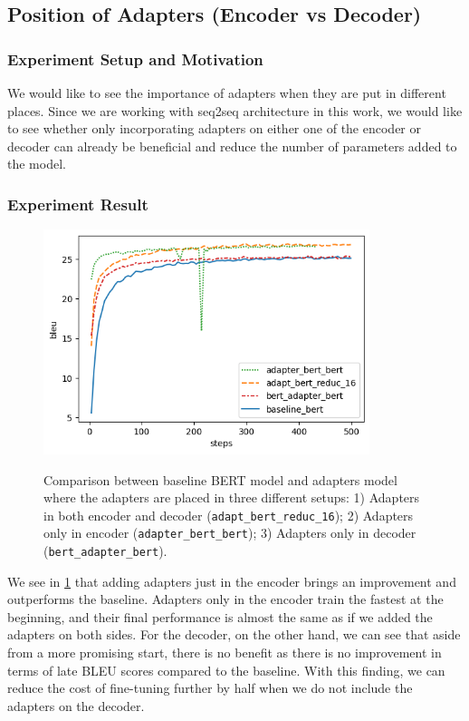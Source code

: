 \subsection{Position of Adapters (Encoder vs Decoder)}
\label{sec:posada}
\subsubsection{Experiment Setup and Motivation}
We would like to see the importance of adapters when they are put in different places. Since we are working with seq2seq architecture in this work, we would like to see whether only incorporating adapters on either one of the encoder or decoder can already be beneficial and reduce the number of parameters added to the model.

\subsubsection{Experiment Result}
\begin{figure}[]
    {\includegraphics[width=0.85\textwidth]{img/bert_pos.png}}
    \centering
    \caption[Results of ablation study for adapters in the encoder or the decoder.]{Comparison between baseline BERT model and adapters model where the adapters are placed in three different setups: 1) Adapters in both encoder and decoder (\texttt{adapt\_bert\_reduc\_16}); 2) Adapters only in encoder (\texttt{adapter\_bert\_bert}); 3) Adapters only in decoder (\texttt{bert\_adapter\_bert}).}
    \label{img:adapt_bert_pos}
\end{figure}
We see in \cref{img:adapt_bert_pos} that adding adapters just in the encoder brings an improvement and outperforms the baseline. Adapters only in the encoder train the fastest at the beginning, and their final performance is almost the same as if we added the adapters on both sides. For the decoder, on the other hand, we can see that aside from a more promising start, there is no benefit as there is no improvement in terms of late BLEU scores compared to the baseline. With this finding, we can reduce the cost of fine-tuning further by half when we do not include the adapters on the decoder.


